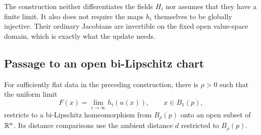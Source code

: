 \begin{remark}
The construction neither differentiates the fields $H_i$ nor assumes
that they have a finite limit.  It also does not require the maps
$h_i$ themselves to be globally injective.  Their ordinary Jacobians
are invertible on the fixed open value-space domain, which is exactly
what the update needs.
\end{remark}

\subsection{Passage to an open bi-Lipschitz chart}

\begin{proposition}
 \label{re:limit-chart}
For sufficiently flat data in the preceding construction, there is
$\rho>0$ such that the uniform limit
\[
 F(x)=\lim_{i\to\infty}h_i(u(x)),\qquad x\in B_1(p),
\]
restricts to a bi-Lipschitz homeomorphism from $B_\rho(p)$ onto an
open subset of $\mathbb R^n$.  Its distance comparisons use the ambient
distance $d$ restricted to $B_\rho(p)$.
\end{proposition}

